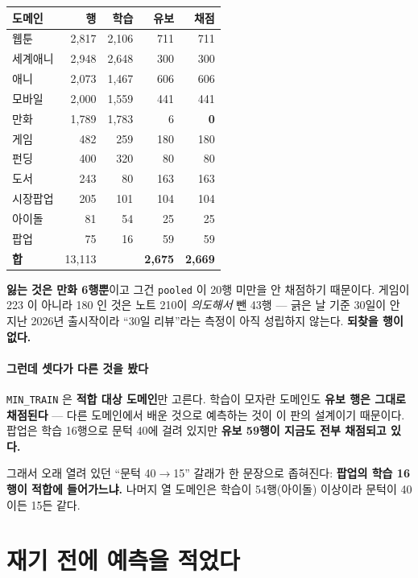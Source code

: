 \documentclass[10pt]{article}
\begin{document}
\begin{center}\footnotesize
\begin{tabular}{lrrrr}
\hline
도메인 & 행 & 학습 & 유보 & 채점 \\
\hline
웹툰 & 2,817 & 2,106 & 711 & 711 \\
세계애니 & 2,948 & 2,648 & 300 & 300 \\
애니 & 2,073 & 1,467 & 606 & 606 \\
모바일 & 2,000 & 1,559 & 441 & 441 \\
만화 & 1,789 & 1,783 & 6 & \textbf{0} \\
게임 & 482 & 259 & 180 & 180 \\
펀딩 & 400 & 320 & 80 & 80 \\
도서 & 243 & 80 & 163 & 163 \\
시장팝업 & 205 & 101 & 104 & 104 \\
아이돌 & 81 & 54 & 25 & 25 \\
팝업 & 75 & 16 & 59 & 59 \\
\hline
\textbf{합} & 13,113 & & \textbf{2,675} & \textbf{2,669} \\
\hline
\end{tabular}
\end{center}

\textbf{잃는 것은 만화 6행뿐}이고 그건 \texttt{pooled} 이 20행 미만을 안
채점하기 때문이다. 게임이 223 이 아니라 180 인 것은 노트 210이 \emph{의도해서}
뺀 43행 --- 긁은 날 기준 30일이 안 지난 2026년 출시작이라 ``30일 리뷰''라는
측정이 아직 성립하지 않는다. \textbf{되찾을 행이 없다.}

\paragraph{그런데 셋다가 다른 것을 봤다} \texttt{MIN\_TRAIN} 은
\textbf{적합 대상 도메인}만 고른다. 학습이 모자란 도메인도 \textbf{유보 행은
그대로 채점된다} --- 다른 도메인에서 배운 것으로 예측하는 것이 이 판의
설계이기 때문이다. 팝업은 학습 16행으로 문턱 40에 걸려 있지만 \textbf{유보
59행이 지금도 전부 채점되고 있다.}

그래서 오래 열려 있던 ``문턱 40$\to$15'' 갈래가 한 문장으로 좁혀진다:
\textbf{팝업의 학습 16행이 적합에 들어가느냐.} 나머지 열 도메인은 학습이
54행(아이돌) 이상이라 문턱이 40이든 15든 같다.

\section{재기 전에 예측을 적었다}
\end{document}
